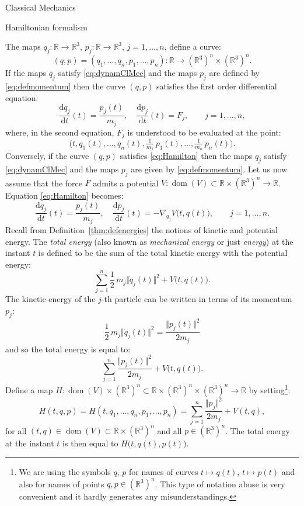 \documentclass[oneside,a4paper,11pt]{amsbook}
\newcommand{\R}{\mathds R}
\newcommand{\dd}{\mathrm d}
\DeclareMathOperator{\Dom}{dom}
\theoremstyle{remark}\newtheorem{exercise}{Exercise}[chapter]
\theoremstyle{plain}\newtheorem{teo}{Theorem}[section]
\theoremstyle{plain}\newtheorem{lem}[teo]{Lemma}
\theoremstyle{plain}\newtheorem{prop}[teo]{Proposition}
\theoremstyle{plain}\newtheorem{cor}[teo]{Corollary}
\theoremstyle{definition}\newtheorem{defin}[teo]{Definition}
\theoremstyle{remark}\newtheorem{rem}[teo]{Remark}
\theoremstyle{definition}\newtheorem{notation}[teo]{Notation}
\theoremstyle{definition}\newtheorem{convention}[teo]{Convention}
\theoremstyle{definition}\newtheorem{example}[teo]{Example}
\numberwithin{section}{chapter}
\numberwithin{equation}{section}
\begin{document}
\begin{chapter}{Classical Mechanics}
\begin{section}{Hamiltonian formalism}
\medskip

The maps $q_j:\R\to\R^3$, $p_j:\R\to\R^3$, $j=1,\ldots,n$, define a curve:
\[(q,p)=(q_1,\ldots,q_n,p_1,\ldots,p_n):\R\longrightarrow(\R^3)^n\times(\R^3)^n.\]
If the maps $q_j$ satisfy \eqref{eq:dynamClMec} and the maps $p_j$ are defined by \eqref{eq:defmomentum}
then the curve $(q,p)$ satisfies the first order differential equation:
\begin{equation}\label{eq:Hamilton}
\frac{\dd q_j}{\dd t}(t)=\frac{p_j(t)}{m_j},\quad\frac{\dd p_j}{\dd t}(t)=F_j,\qquad j=1,\ldots,n,
\end{equation}
where, in the second equation, $F_j$ is understood to be evaluated at the point:
\[\big(t,q_1(t),\ldots,q_n(t),\tfrac1{m_1}\,p_1(t),\ldots,\tfrac1{m_n}\,p_n(t)\big).\]
Conversely, if the curve $(q,p)$ satisfies \eqref{eq:Hamilton} then the maps $q_j$ satisfy \eqref{eq:dynamClMec}
and the maps $p_j$ are given by \eqref{eq:defmomentum}. Let us now assume that the force $F$
admits a potential $V:\Dom(V)\subset\R\times(\R^3)^n\to\R$. Equation \eqref{eq:Hamilton} becomes:
\begin{equation}\label{eq:Hamilton2}
\frac{\dd q_j}{\dd t}(t)=\frac{p_j(t)}{m_j},\quad\frac{\dd p_j}{\dd t}(t)=-\nabla_{q_j}V\big(t,q(t)\big),\qquad j=1,\ldots,n.
\end{equation}
Recall from Definition~\ref{thm:defenergies} the notions of kinetic and potential energy. The {\em total energy\/}
(also known as {\em mechanical energy\/} or just {\em energy}) at the instant $t$ is defined to be the sum of
the total kinetic energy with the potential energy:
\begin{equation}\label{eq:totalenergy}
\sum_{j=1}^n\frac12\,m_j\Vert\dot q_j(t)\Vert^2+V\big(t,q(t)\big).
\end{equation}
The kinetic energy of the $j$-th particle can be written in terms of its momentum $p_j$:
\[\frac12\,m_j\Vert\dot q_j(t)\Vert^2=\frac{\Vert p_j(t)\Vert^2}{2m_j}\]
and so the total energy is equal to:
\[\sum_{j=1}^n\frac{\Vert p_j(t)\Vert^2}{2m_j}+V\big(t,q(t)\big).\]
Define a map $H:\Dom(V)\times(\R^3)^n\subset\R\times(\R^3)^n\times(\R^3)^n\to\R$ by setting\footnote{%
We are using the symbols $q$, $p$ for names of curves $t\mapsto q(t)$, $t\mapsto p(t)$ and also for names of
points $q,p\in(\R^3)^n$. This type of notation abuse is very convenient and it hardly generates any misunderstandings.}:
\begin{equation}\label{eq:defH}
H(t,q,p)=H(t,q_1,\ldots,q_n,p_1,\ldots,p_n)=\sum_{j=1}^n\frac{\Vert p_j\Vert^2}{2m_j}+V(t,q),
\end{equation}
for all $(t,q)\in\Dom(V)\subset\R\times(\R^3)^n$ and all $p\in(\R^3)^n$. The total
energy at the instant $t$ is then equal to $H\big(t,q(t),p(t)\big)$.


\end{section}
\end{chapter}
\end{document}
